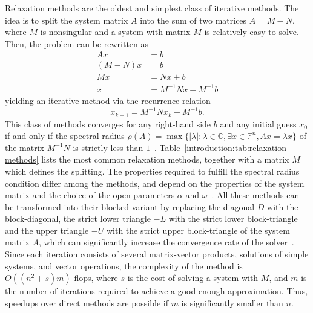 Relaxation methods are the oldest and simplest class of iterative methods.
The idea is to split the system matrix $A$ into the sum of two matrices $A = M -
N$, where $M$ is nonsingular and a system with matrix $M$ is relatively easy to
solve. Then, the problem can be rewritten as
\begin{align}
Ax &= b\\
(M - N)x &= b\\
Mx &= Nx + b \\
x &= M^{-1}Nx + M^{-1}b
\end{align}
yielding an iterative method via the recurrence relation
\begin{equation}
    x_{k+1} = M^{-1}Nx_k + M^{-1}b. \label{introduction:eqn:relaxation}
\end{equation}
This class of methods converges for any right-hand side $b$ and any initial
guess $x_0$  if and only if the spectral radius $\rho(A) = \max \{ \vert \lambda
\vert : \lambda \in \mathbb{C}, \exists x \in \mathbb{F}^n, Ax = \lambda x \}$
of the matrix $M^{-1}N$ is strictly less than $1$~\cite{demmel,saad}.
Table~\ref{introduction:tab:relaxation-methods} lists the most common relaxation
methods, together with a matrix $M$ which defines the splitting. The properties
required to fulfill the spectral radius condition differ among the methods, and
depend on the properties of the system matrix and the choice of the open
parameters $\alpha$ and $\omega$~\cite{barrettemplates}. All these methods
can be transformed into their blocked variant by replacing the diagonal $D$ with
the block-diagonal, the strict lower triangle $-L$ with the strict lower
block-triangle and the upper triangle $-U$ with the strict upper block-triangle
of the system matrix $A$, which can significantly increase the convergence rate
of the solver~\cite{saad}.  Since each iteration consists of several
matrix-vector products, solutions of simple systems, and vector operations, the
complexity of the method is $O((n^2 + s) m)$ flops, where $s$ is the cost of
solving a system with $M$, and $m$ is the number of iterations required to
achieve a good enough approximation. Thus, speedups over direct methods are
possible if $m$ is significantly smaller than $n$.


